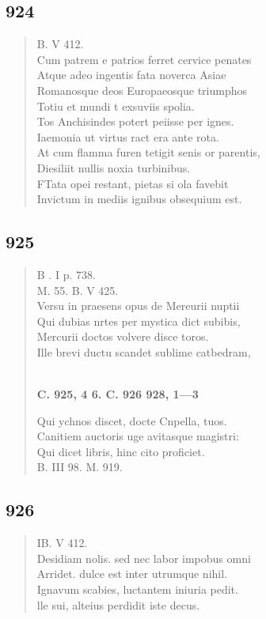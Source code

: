 \documentclass[11pt, a4paper]{report}
\begin{document}
            \subsection*{924}
      \begin{verse}
      B. V 412. \\ Cum patrem e patrios ferret cervice penates \\ Atque adeo ingentis fata noverca Asiae \\ Romanosque deos Europaeosque triumphos \\ Totiu et mundi t exsuviis spolia. \\ Tos Anchisindes potert peiisse per ignes. \\ Iaemonia ut virtus ract era ante rota. \\ At cum flamma furen tetigit senis or parentis, \\ Diesiliit nullis noxia turbinibus. \\ FTata opei restant, pietas si ola favebit \\ Invictum in mediis ignibus obsequium est. \\ 
      \end{verse}
  
            \subsection*{925}
      \begin{verse}
      B . I p. 738. \\ M. 55. B. V 425. \\ Versu in praesens opus de Mereurii nuptii \\ Qui dubias nrtes per mystica dict subibis, \\ Mercurii doctos volvere disce toros. \\ Ille brevi ductu scandet sublime catbedram, \\ 
        ﻿\pagebreak 
    \begin{center} \textbf{C. 925, 4 6. C. 926 928, 1—3} \end{center} \marginpar{[349]} Qui ychnos discet, docte Cnpella, tuos. \\ Canitiem auctoris uge avitasque magistri: \\ Qui dicet libris, hinc cito proficiet. \\ B. III 98. M. 919. \\ 
      \end{verse}
  
            \subsection*{926}
      \begin{verse}
      IB. V 412. \\ Desidiam nolis. sed nec labor impobus omni \\ Arridet. dulce est inter utrumque nihil. \\ Ignavum scabies, luctantem iniuria pedit. \\ lle sui, alteius perdidit iste decus. \\ 
      \end{verse}
  
\end{document}
